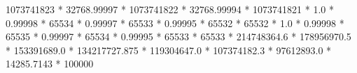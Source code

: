 1073741823
*\m{\texdimenwithunit{\maxdimen-1sp}{32767sp}}
32768.99997
*
1073741822
*\m{\texdimenwithunit{\maxdimen-2sp}{32767sp}}
32768.99994
*
1073741821
*\m{\texdimenwithunit{65535sp}{65535sp}}
1.0
*\m{\texdimenwithunit{65534sp}{65535sp}}
0.99998
*
65534
*\m{\texdimenwithunit{65533sp}{65535sp}}
0.99997
*
65533
*\m{\texdimenwithunit{65532sp}{65535sp}}
0.99995
*
65532
*
65532
*\m{\texdimenwithunit{65536sp}{65536sp}}
1.0
*\m{\texdimenwithunit{65535sp}{65536sp}}
0.99998
*
65535
*\m{\texdimenwithunit{65534sp}{65536sp}}
0.99997
*
65534
*\m{\texdimenwithunit{65533sp}{65536sp}}
0.99995
*
65533
*
65533
*\m{\texdimenwithunit{\maxdimen}{5sp}}
214748364.6
*\m{\texdimenwithunit{\maxdimen}{6sp}}
178956970.5
*\m{\texdimenwithunit{\maxdimen}{7sp}}
153391689.0
*\m{\texdimenwithunit{\maxdimen}{8sp}}
134217727.875
*\m{\texdimenwithunit{\maxdimen}{9sp}}
119304647.0
*\m{\texdimenwithunit{\maxdimen}{10sp}}
107374182.3
*\m{\texdimenwithunit{\maxdimen}{11sp}}
97612893.0
*\m{\texdimenwithunit{100000sp}{7sp}}
14285.7143
*
100000
\bye
